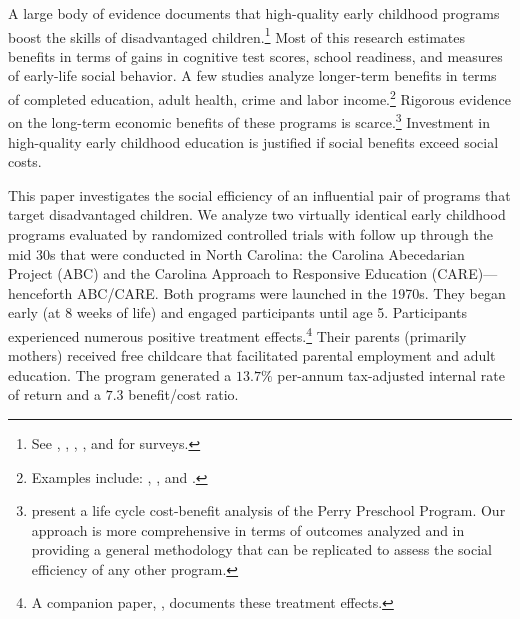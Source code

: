 \noindent A large body of evidence documents that high-quality early childhood programs boost the skills of disadvantaged children.\footnote{See \citet{Blau_Currie_2006_HEE}, \citet{Cunha_Heckman_ea_2006_HEE}, \citet{Duncan_Magnuson_2013_JEP}, \citet{Almond-Currie_2011_JEP}, and \citet{Elango_Hojman_etal_2016_Early-Edu} for surveys.} Most of this research estimates benefits in terms of gains in cognitive test scores, school readiness, and measures of early-life social behavior. A few studies analyze longer-term benefits in terms of completed education, adult health, crime and labor income.\footnote{Examples include: \citet{Heckman_Moon_etal_2010_QE}, \citet{Havnes_Mogstad_2011_AEJEP}, and \citet{Campbell_Conti_etal_2014_EarlyChildhoodInvestments}.} Rigorous evidence on the long-term economic benefits of these programs is scarce.\footnote{\citet{Heckman_Moon_etal_2010_RateofReturn} present a life cycle cost-benefit analysis of the Perry Preschool Program. Our approach is more comprehensive in terms of outcomes analyzed and in providing a general methodology that can be replicated to assess the social efficiency of any other program.} Investment in high-quality early childhood education is justified if social benefits exceed social costs.

This paper investigates the social efficiency of an influential pair of programs that target disadvantaged children. We analyze two virtually identical early childhood programs evaluated by randomized controlled trials with follow up through the mid 30s that were conducted in North Carolina: the Carolina Abecedarian Project (ABC) and the Carolina Approach to Responsive Education (CARE)---henceforth ABC/CARE. Both programs were launched in the 1970s. They began early (at 8 weeks of life) and engaged participants until age 5. Participants experienced numerous positive treatment effects.\footnote{A companion paper, \citet{Garcia_Heckman_Ziff_2017_Gender-Diff_UNPUBLISHED}, documents these treatment effects.} Their parents (primarily mothers) received free childcare that facilitated parental employment and adult education. The program generated a $13.7\%$ per-annum tax-adjusted internal rate of return and a $7.3$ benefit/cost ratio.

